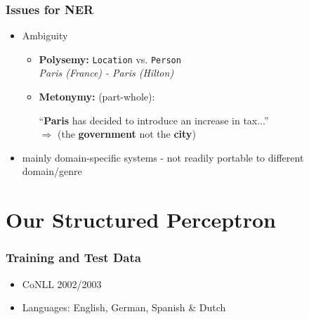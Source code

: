 \documentclass[10pt]{beamer}
\begin{document}
\begin{frame}
\frametitle{Issues for NER}


\begin{itemize}
 \item Ambiguity


\begin{itemize}
 \item \textbf{Polysemy:} \texttt{Location} vs. \texttt{Person} \\
 
 \emph{Paris (France) - Paris (Hilton)}\\
 
 \item \textbf{Metonymy:}  (part-whole):
 
 ``\textbf{Paris} has decided to introduce an increase in tax...'' \\
 
 $\Rightarrow$ (the \textbf{government} not the \textbf{city})  
\end{itemize}

 \item mainly domain-specific systems - not readily portable to different domain/genre %
 
\end{itemize}

\end{frame}



\section{Our Structured Perceptron}
\begin{frame}
\frametitle{Training and Test Data}

\begin{itemize}
 \item CoNLL 2002/2003 
 \item Languages: English, German, Spanish \& Dutch
\end{itemize}
\end{frame}


\end{document}
